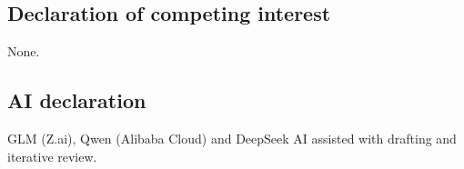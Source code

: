 \documentclass[11pt]{article}
\begin{document}
\subsection*{Declaration of competing interest}

None.

\subsection*{AI declaration}
GLM (Z.ai), Qwen (Alibaba Cloud) and DeepSeek AI assisted with drafting and iterative review.
\end{document}
